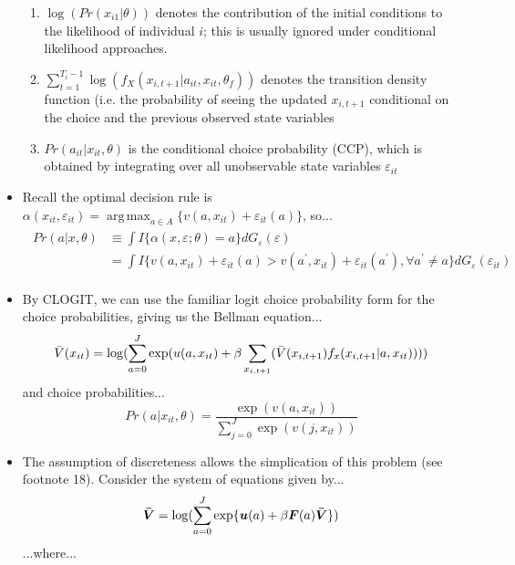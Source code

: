\documentclass[11pt]{article}
\DeclareMathOperator*{\argmax}{arg\,max}
\begin{document}
\begin{itemize}
\begin{enumerate}
        \item $\log(Pr(x_{i1}|\theta))$ denotes the contribution of the initial conditions to the likelihood of individual $i$; this is usually ignored under conditional likelihood approaches.
        \item $\sum_{t=1}^{T_i - 1}\log(f_X(x_{i,t+1}|a_{it},x_{it},\theta_f))$ denotes the transition density function (i.e. the probability of seeing the updated $x_{i,t+1}$ conditional on the choice and the previous observed state variables
        \item $Pr(a_{it}|x_{it},\theta)$ is the conditional choice probability (CCP), which is obtained by integrating over all unobservable state variables $\varepsilon_{it}$
    \end{enumerate}
    \item Recall the optimal decision rule is $\alpha(x_{it},\varepsilon_{it}) = \argmax_{a \in A} \{v(a,x_{it}) + \varepsilon_{it}(a)\}$, so...
    \begin{align}
        \begin{split}
            Pr(a|x,\theta) &\equiv \int I\{\alpha(x,\varepsilon;\theta) = a\} dG_\varepsilon(\varepsilon) \\
            &= \int I\{v(a,x_{it}) + \varepsilon_{it}(a) > v(a^\prime, x_{it}) + \varepsilon_{it}(a^\prime), \forall a^\prime \neq a\} dG_\varepsilon(\varepsilon_{it})
        \end{split}
    \end{align}
    \item By CLOGIT, we can use the familiar logit choice probability form for the choice probabilities, giving us the Bellman equation...
    \begin{equation}
        \Bar{V}(x_{it}) = \log(\sum_{a=0}^J \exp(u(a,x_{it}) + \beta \sum_{x_{i,t+1}}(\Bar{V}(x_{i,t+1})f_x(x_{i,t+1}|a,x_{it}))))
    \end{equation}
    and choice probabilities...
    \begin{equation}
        Pr(a|x_{it},\theta) = \frac{\exp(v(a,x_{it}))}{\sum_{j=0}^J\exp(v(j,x_{it}))}
    \end{equation}
    \item The assumption of discreteness allows the simplication of this problem (see footnote 18). Consider the system of equations given by...
    \begin{equation}
        \bm{\Bar{V}} = \log(\sum_{a=0}^J \exp\{\bm{u}(a) +\beta \bm{F}(a) \bm{\Bar{V}}\})
    \end{equation}
    ...where...

\end{itemize}
\end{document}
